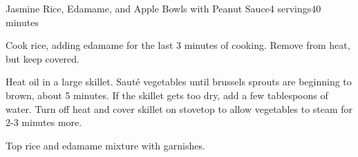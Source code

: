 \documentclass[../Cookbook.tex]{subfiles}
\begin{document}
\begin{recipe}{Jasmine Rice, Edamame, and Apple Bowls with Peanut Sauce}{4 servings}{40 minutes}

Cook rice, adding edamame for the last 3 minutes of cooking. Remove from heat, but keep covered.

Heat oil in a large skillet. Saut\'e vegetables until brussels sprouts are beginning to brown, about 5 minutes. If the skillet gets too dry, add a few tablespoons of water. Turn off heat and cover skillet on stovetop to allow vegetables to steam for 2-3 minutes more.

Top rice and edamame mixture with garnishes.

\end{recipe}
\end{document}
